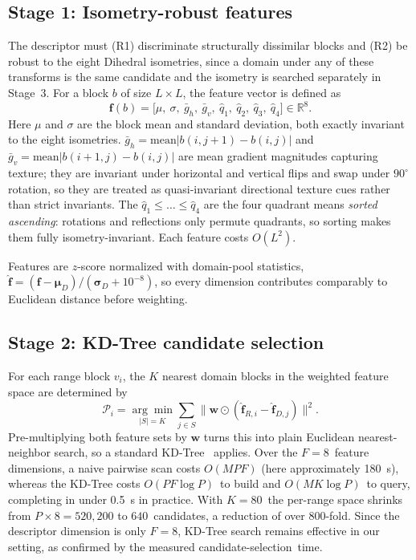 \documentclass[conference, a4paper]{IEEEtran}
\begin{document}
\subsection{Stage 1: Isometry-robust features}
The descriptor must (R1) discriminate structurally dissimilar blocks and (R2) be robust to the eight Dihedral isometries, since a domain under any of these transforms is the same candidate and the isometry is searched separately in Stage~3. For a block \mbox{$b$} of size \mbox{$L\times L$}, the feature vector is defined as
\begin{equation}
    \mathbf{f}(b)=\bigl[\mu,\ \sigma,\ \bar g_h,\ \bar g_v,\ \hat q_1,\ \hat q_2,\ \hat q_3,\ \hat q_4\bigr]\in\mathbb{R}^8.
    \label{eq:features}
\end{equation}
Here \mbox{$\mu$} and \mbox{$\sigma$} are the block mean and standard deviation, both exactly invariant to the eight isometries. \mbox{$\bar g_h=\mathrm{mean}|b(i,j\!+\!1)\!-\!b(i,j)|$} and \mbox{$\bar g_v=\mathrm{mean}|b(i\!+\!1,j)\!-\!b(i,j)|$} are mean gradient magnitudes capturing texture; they are invariant under horizontal and vertical flips and swap under \mbox{$90^\circ$} rotation, so they are treated as quasi-invariant directional texture cues rather than strict invariants. The \mbox{$\hat q_1\!\le\!\dots\!\le\!\hat q_4$} are the four quadrant means \emph{sorted ascending}: rotations and reflections only permute quadrants, so sorting makes them fully isometry-invariant. Each feature costs \mbox{$O(L^2)$}.

Features are \mbox{$z$}-score normalized with domain-pool statistics, \mbox{$\hat{\mathbf f}=(\mathbf f-\boldsymbol\mu_D)/(\boldsymbol\sigma_D+10^{-8})$}, so every dimension contributes comparably to Euclidean distance before weighting.

\subsection{Stage 2: KD-Tree candidate selection}
For each range block \mbox{$v_i$}, the \mbox{$K$} nearest domain blocks in the weighted feature space are determined by
\begin{equation}
    \mathcal{P}_i=\underset{|S|=K}{\arg\min}\sum_{j\in S}\bigl\|\mathbf w\odot(\hat{\mathbf f}_{R,i}-\hat{\mathbf f}_{D,j})\bigr\|^2 .
    \label{eq:knn}
\end{equation}
Pre-multiplying both feature sets by \mbox{$\mathbf w$} turns this into plain Euclidean nearest-neighbor search, so a standard KD-Tree~\cite{bentley1975multidimensional} applies. Over the \mbox{$F\!=\!8$}~feature dimensions, a naive pairwise scan costs \mbox{$O(MPF)$} (here approximately 180~s), whereas the KD-Tree costs \mbox{$O(PF\log P)$}~to build and \mbox{$O(MK\log P)$}~to query, completing in under 0.5~s in practice. With \mbox{$K\!=\!80$}~the per-range space shrinks from \mbox{$P\!\times\!8=520{,}200$} to \mbox{$640$}~candidates, a reduction of over 800-fold. Since the descriptor dimension is only \mbox{$F\!=\!8$}, KD-Tree search remains effective in our setting, as confirmed by the measured candidate-selection~time.
\end{document}
